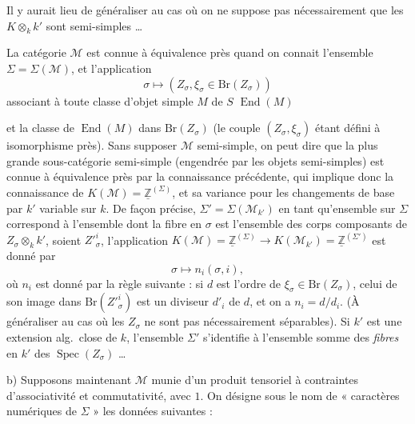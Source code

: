 \documentclass[11pt,a4paper]{article}
\begin{document}
Il y aurait lieu de généraliser au cas où on ne suppose pas nécessairement
que les $K \otimes_{k} k'$ sont semi-simples …

 La catégorie $\mathcal{M}$ est connue
à équivalence près quand on connait l'ensemble $\Sigma = \Sigma(\mathcal{M})$,
et l'application
\[
\sigma \longmapsto (Z_{\sigma}, \xi_{\sigma} \in \mathrm{Br}(Z_{\sigma}))
\]
associant à toute classe d'objet simple $M$ de $S$ 
 $\operatorname{End}(M)$

et la classe de $\operatorname{End}(M)$ dans $\mathrm{Br}(Z_{\sigma})$ (le
couple $(Z_{\sigma}, \xi_{\sigma})$ étant défini à isomorphisme près). Sans
supposer $\mathcal{M}$ semi-simple, on peut  dire que
la plus grande sous-catégorie semi-simple (engendrée par les objets
semi-simples) est connue à équivalence près par la connaissance précédente,
qui implique donc la connaissance de
$K(\mathcal{M}) = \underline{\mathbb{Z}}^{(\Sigma)}$,  et sa
variance pour les changements de base par $k'$ variable sur $k$. De façon
précise, $\Sigma' = \Sigma(\mathcal{M}_{k'})$ en tant qu'ensemble sur
$\Sigma$ correspond à l'ensemble  dont la fibre en $\sigma$
est l'ensemble des corps composants de $Z_{\sigma} \otimes_{k} k'$, soient
$Z'^{i}_{\sigma}$, l'application
$K(\mathcal{M}) = \underline{\mathbb{Z}}^{(\Sigma)} \to
K(\mathcal{M}_{k'}) = \underline{\mathbb{Z}}^{(\Sigma')}$ est donné par
\[
\sigma \longmapsto n_{i}(\sigma, i) ,
\]
où $n_{i}$ est donné par la règle suivante : si $d$ est 
l'ordre de $\xi_{\sigma} \in \mathrm{Br}(Z_{\sigma})$, celui de son image dans
$\mathrm{Br}(Z'^{i}_{\sigma})$ est un \struck{\ill{}} diviseur $d'_{i}$ de
$d$, et on a $n_{i} = d/d_{i}$. (À généraliser au cas où les $Z_{\sigma}$ ne
sont pas nécessairement séparables). Si $k'$ est une \struck{\ill{}} extension
alg.\ close de $k$, l'ensemble $\Sigma'$ s'identifie à l'ensemble somme des
\emph{fibres} en $k'$ des $\operatorname{Spec}(Z_{\sigma})$ …

b) \quad Supposons maintenant $\mathcal{M}$  munie
d'un produit tensoriel à contraintes d'associativité et commutativité, avec
$1$. On désigne sous le nom de « caractères numériques de $\Sigma$ » les
données suivantes :

\end{document}
